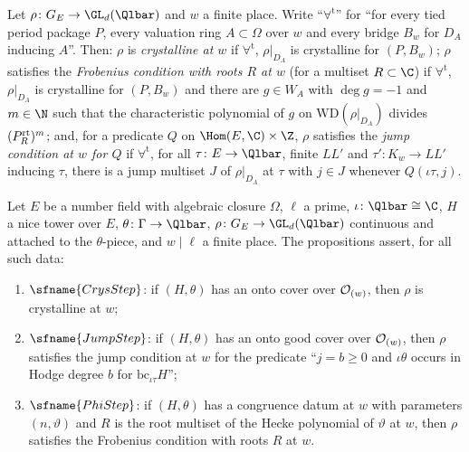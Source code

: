 \begin{definition}[Conditions at $w$]\label{pf:steps1:def:conds}
Let $\rho\colon G_E\to\GL_d(\Qlbar)$ and $w$ a finite place. Write ``$\forall^{\mathrm t}$'' for ``for every
tied period package $P$, every valuation ring $A\subset\Omega$ over $w$ and every bridge $B_w$ for $D_A$
inducing $A$''. Then: $\rho$ is \emph{crystalline at $w$} if $\forall^{\mathrm t}$, $\rho|_{D_A}$ is crystalline for
$(P,B_w)$; $\rho$ satisfies the \emph{Frobenius condition with roots $R$ at $w$} (for a multiset $R\subset\C$)
if $\forall^{\mathrm t}$, $\rho|_{D_A}$ is crystalline for $(P,B_w)$ and there are $g\in W_A$ with $\deg g=-1$ and
$m\in\N$ such that the characteristic polynomial of $g$ on $\mathrm{WD}(\rho|_{D_A})$ divides $(P^{\mathrm{rt}}_R)^m$;
and, for a predicate $Q$ on $\Hom(E,\C)\times\Z$, $\rho$ satisfies the \emph{jump condition at $w$ for $Q$} if
$\forall^{\mathrm t}$, for all $\tau\colon E\to\Qlbar$, finite $LL'$ and $\tau'\colon K_w\to LL'$ inducing $\tau$, there is
a jump multiset $J$ of $\rho|_{D_A}$ at $\tau$ with $j\in J$ whenever $Q(\iota\tau,j)$.
  
\end{definition}

\begin{definition}\label{pf:steps1:def:steps}
Let $E$ be a number field with algebraic closure $\Omega$, $\ell$ a prime, $\iota\colon\Qlbar\cong\C$, $H$ a nice
tower over $E$, $\theta\colon\Gamma\to\Qlbar$, $\rho\colon G_E\to\GL_d(\Qlbar)$ continuous and attached to the
$\theta$-piece, and $w\mid\ell$ a finite place. The propositions assert, for all such data:
\begin{enumerate}[label=\textup{(\roman*)},nosep]
\item $\sfname{CrysStep}$: if $(H,\theta)$ has an onto cover over $\mathcal{O}_{(w)}$, then $\rho$ is crystalline at $w$;
\item $\sfname{JumpStep}$: if $(H,\theta)$ has an onto good cover over $\mathcal{O}_{(w)}$, then $\rho$ satisfies the jump
  condition at $w$ for the predicate ``$j=b\ge0$ and $\iota\theta$ occurs in Hodge degree $b$ for
  $\mathrm{bc}_{\iota\tau}H$'';
\item $\sfname{PhiStep}$: if $(H,\theta)$ has a congruence datum at $w$ with parameters $(n,\vartheta)$ and $R$ is the
  root multiset of the Hecke polynomial of $\vartheta$ at $w$, then $\rho$ satisfies the Frobenius condition with
  roots $R$ at $w$.
\end{enumerate}
 
\end{definition}

